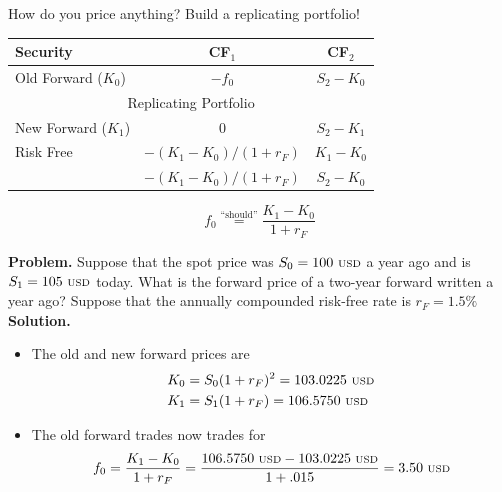 \documentclass{beamer}
\begin{document}
\begin{frame}{}
    How do you price anything? Build a replicating portfolio!
    \begin{center}
        \begin{tabular}{lcc}
            Security & CF$_{1}$ & CF$_{2}$ \\ \hline
            Old Forward ($K_{0}$) &  $-f_{0}$ & $S_{2}-K_{0}$ \\ \hline
            \multicolumn{3}{c}{Replicating Portfolio} \\ \hline
			New Forward ($K_{1}$) & $0$& $S_{2}-K_{1}$ \\ 
			Risk Free &  $-(K_{1}-K_{0})/(1+r_{F})$ & $K_{1}-K_{0}$ \\ \hline
			& $-(K_{1}-K_{0})/(1+r_{F})$ & $S_{2}-K_{0}$
        \end{tabular}
    \end{center}
    \begin{equation}
		\boxed{f_{0}\overset{\text{``should''}}{=}\frac{K_{1}-K_{0}}{1+r_{F}}}
    \end{equation}
\end{frame}

\begin{frame}{}
	\textbf{Problem.} Suppose that the spot price was $S_{0}=100\text{ {\scriptsize USD}}$ a year ago and is $S_{1}=105\text{ {\scriptsize USD}}$ today. What is the forward price of a two-year forward written a year ago? Suppose that the annually compounded risk-free rate is $r_{F}=1.5\%$\\
	\vfill
	\textbf{Solution.}
	\begin{itemize}
        \item The old and new forward prices are 
            \begin{align}
				K_{0}&=S_{0}(1+r_{F})^{2}=103.0225\text{ {\scriptsize USD}}\\
				K_{1}&=S_{1}(1+r_{F})=106.5750\text{ {\scriptsize USD}}
            \end{align}
        \item The old forward trades now trades for
            \begin{equation}\small
				f_{0}=\frac{K_{1}-K_{0}}{1+r_{F}}=\frac{106.5750\text{ {\scriptsize USD}}-103.0225\text{ {\scriptsize USD}}}{1+.015}=3.50\text{ {\scriptsize USD}}
            \end{equation}
    \end{itemize}
\end{frame}
\end{document}
